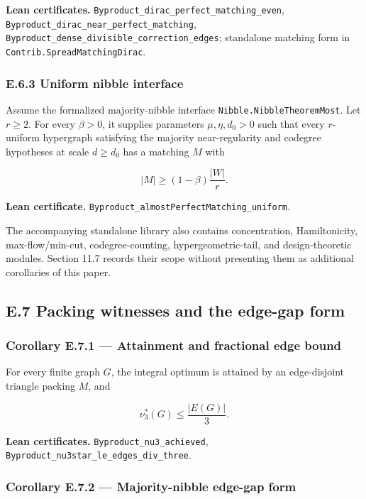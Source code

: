 \documentclass[
  american,
  11pt,
  a4paper,
]{article}
\begin{document}
\textbf{Lean certificates.} \texttt{Byproduct\_dirac\_perfect\_matching\_even}, \texttt{Byproduct\_dirac\_near\_perfect\_matching}, \texttt{Byproduct\_dense\_divisible\_correction\_edges}; standalone matching form in \texttt{Contrib.SpreadMatchingDirac}.

\subsubsection{E.6.3 Uniform nibble interface}\label{e.6.3-uniform-nibble-interface}

Assume the formalized majority-nibble interface \texttt{Nibble.NibbleTheoremMost}. Let \(r\ge2\). For every \(\beta>0\), it supplies parameters \(\mu,\eta,d_0>0\) such that every \(r\)-uniform hypergraph satisfying the majority near-regularity and codegree hypotheses at scale \(d\ge d_0\) has a matching \(M\) with

\[
|M|\ge(1-\beta)\frac{|W|}{r}.
\]

\textbf{Lean certificate.} \texttt{Byproduct\_almostPerfectMatching\_uniform}.

The accompanying standalone library also contains concentration, Hamiltonicity, max-flow/min-cut, codegree-counting, hypergeometric-tail, and design-theoretic modules. Section 11.7 records their scope without presenting them as additional corollaries of this paper.

\subsection{E.7 Packing witnesses and the edge-gap form}\label{e.7-packing-witnesses-and-the-edge-gap-form}

\subsubsection{Corollary E.7.1 --- Attainment and fractional edge bound}\label{corollary-e.7.1-attainment-and-fractional-edge-bound}

For every finite graph \(G\), the integral optimum is attained by an edge-disjoint triangle packing \(M\), and

\[
\nu_3^*(G)\le\frac{|E(G)|}{3}.
\]

\textbf{Lean certificates.} \texttt{Byproduct\_nu3\_achieved}, \texttt{Byproduct\_nu3star\_le\_edges\_div\_three}.

\subsubsection{Corollary E.7.2 --- Majority-nibble edge-gap form}\label{corollary-e.7.2-majority-nibble-edge-gap-form}
\end{document}
